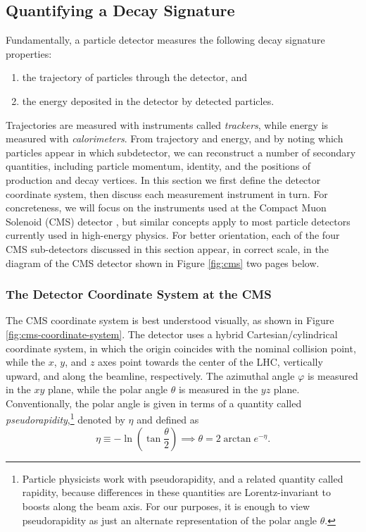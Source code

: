 \documentclass[11pt, a4paper]{article}
\begin{document}
\subsection{Quantifying a Decay Signature} \label{ss:quantify-decay}
Fundamentally, a particle detector measures the following decay signature properties:
\begin{enumerate}

    \item the trajectory of particles through the detector, and

    \item the energy deposited in the detector by detected particles.

\end{enumerate}
Trajectories are measured with instruments called \textit{trackers}, while energy is measured with \textit{calorimeters}.
From trajectory and energy, and by noting which particles appear in which subdetector, we can reconstruct a number of secondary quantities, including particle momentum, identity, and the positions of production and decay vertices.
In this section we first define the detector coordinate system, then discuss each measurement instrument in turn.
For concreteness, we will focus on the instruments used at the Compact Muon Solenoid (CMS) detector \cite{cms}, but similar concepts apply to most particle detectors currently used in high-energy physics.
For better orientation, each of the four CMS sub-detectors discussed in this section appear, in correct scale, in the diagram of the CMS detector shown in Figure \ref{fig:cms} two pages below.

\subsubsection{The Detector Coordinate System at the CMS}
The CMS coordinate system is best understood visually, as shown in Figure \ref{fig:cms-coordinate-system}.
The detector uses a hybrid Cartesian/cylindrical coordinate system, in which the origin coincides with the nominal collision point, while the $ x $, $ y $, and $ z $ axes point towards the center of the LHC, vertically upward, and along the beamline, respectively.
The azimuthal angle $ \varphi $ is measured in the $ xy $ plane, while the polar angle $ \theta $ is measured in the $ yz $ plane.
Conventionally, the polar angle is given in terms of a quantity called \textit{pseudorapidity},\footnote{Particle physicists work with pseudorapidity, and a related quantity called rapidity, because differences in these quantities are Lorentz-invariant to boosts along the beam axis.
For our purposes, it is enough to view pseudorapidity as just an alternate representation of the polar angle $ \theta $.} denoted by $ \eta $ and defined as
\begin{equation}
    \eta \equiv - \ln \left( \tan \frac{\theta}{2} \right) \implies \theta = 2 \arctan e^{- \eta}. \label{eq:pseudorapidity}
\end{equation}
\end{document}
